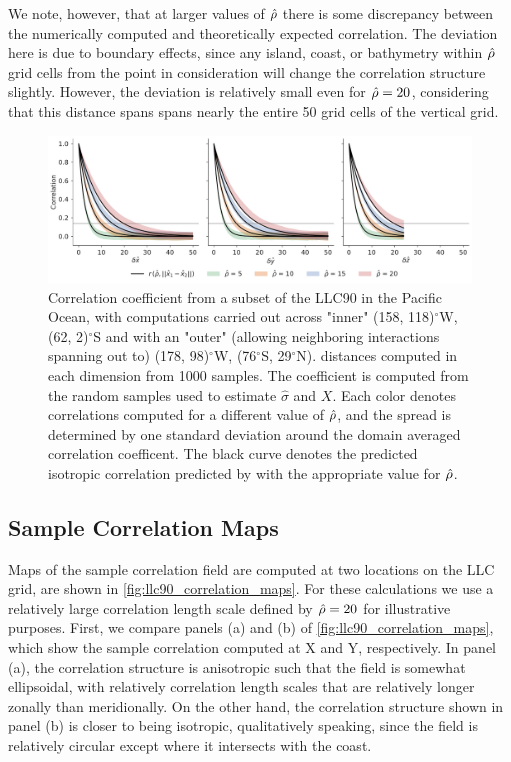 We note, however, that at larger values of $\hat{\rho}$ there is some discrepancy
between the numerically computed and theoretically expected correlation.
The deviation here is due to boundary effects, since any island, coast, or
bathymetry within $\hat{\rho}$ grid cells from the point in consideration will
change the correlation structure slightly.
However, the deviation is relatively small even for $\hat{\rho}=20$, considering
that this distance spans spans nearly the entire 50 grid cells of the vertical
grid.

\begin{figure}
    \centering
    \includegraphics[width=\textwidth]{../figures/matern_llc90_correlation-k25-iy165-ix90-1000samples-4curves.pdf}
    \caption{Correlation coefficient from a subset of the LLC90 in the Pacific
        Ocean, with computations carried out across "inner"
        (158, 118)$^\circ$W,
        (62, 2)$^\circ$S and
        with an "outer" (allowing neighboring interactions spanning out to)
        (178, 98)$^\circ$W,
        (76$^\circ$S, 29$^\circ$N).
        distances computed in each dimension from 1000 samples. The coefficient is
        computed from the random samples used to estimate
        $\hat{\sigma}$ and $X$. Each color denotes correlations computed for a
        different value of $\hat{\rho}$, and the spread is determined by one standard
        deviation around the domain averaged correlation coefficent.
        The black curve denotes the predicted isotropic correlation predicted by
         with the appropriate value for
        $\hat{\rho}$.}
    \label{fig:llc90_correlations}
\end{figure}

\subsection{Sample Correlation Maps}
\label{ssec:llc90_correlation_maps}

Maps of the sample correlation field are computed at two locations on the LLC
grid, are shown in
\cref{fig:llc90_correlation_maps}.
For these calculations we use a relatively large correlation length scale
defined by $\hat{\rho}=20$ for illustrative purposes.
First, we compare panels (a) and (b) of \cref{fig:llc90_correlation_maps}, which
show the sample correlation computed at X and Y, respectively.
In panel (a), the correlation structure is anisotropic such that the field is
somewhat ellipsoidal, with relatively correlation length scales that are
relatively longer zonally than meridionally.
On the other hand, the correlation structure shown in panel (b) is closer to
being isotropic, qualitatively speaking, since the field is relatively circular
except where it intersects with the coast.

